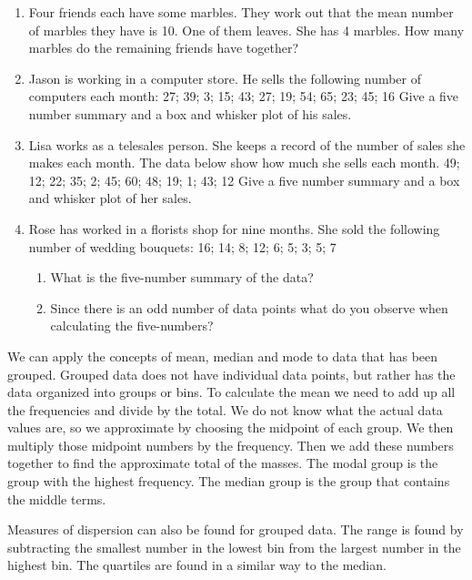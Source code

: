 \begin{description}[noitemsep]
\begin{description}[noitemsep]
\begin{enumerate}[noitemsep, label=\textbf{\arabic*}. ]
\label{m39400*uid102}\item Four friends each have some marbles. They work out that the mean number of marbles they have is 10. One of them leaves. She has 4 marbles. How many marbles do the remaining friends have together?\newline
\item Jason is working in a computer store. He sells the following number of computers each month:
27; 39; 3; 15; 43; 27; 19; 54; 65; 23; 45; 16
Give a five number summary and a box and whisker plot of his sales.\newline
\item Lisa works as a telesales person. She keeps a record of the number of sales she makes each month. The data below show how much she sells each month.
49; 12; 22; 35; 2; 45; 60; 48; 19; 1; 43; 12
Give a five number summary and a box and whisker plot of her sales.\newline
\item Rose has worked in a florists shop for nine months. She sold the following number of wedding bouquets:
16; 14; 8; 12; 6; 5; 3; 5; 7
\label{m39400*id63452}\begin{enumerate}[noitemsep, label=\textbf{\alph*}. ] 
            \item What is the five-number summary of the data?\item Since there is an odd number of data points what do you observe when calculating the five-numbers?\end{enumerate}
\end{enumerate}
\label{m39400*eip-405}We can apply the concepts of mean, median and mode to data that has been grouped. Grouped data does not have individual data points, but rather has the data organized into groups or bins. To calculate the mean we need to add up all the frequencies and divide by the total. We do not know what the actual data values are, so we approximate by choosing the midpoint of each group. We then multiply those midpoint numbers by the frequency. Then we add these numbers together to find the approximate total of the masses. The modal group is the group with the highest frequency. The median group is the group that contains the middle terms.\par \label{m39400*eip-151}Measures of dispersion can also be found for grouped data. The range is found by subtracting the smallest number in the lowest bin from the largest number in the highest bin. The quartiles are found in a similar way to the median.\par \label{m39400*secfhsst!!!underscore!!!id2004}\vspace{.5cm} 

\end{description}
\end{description}
